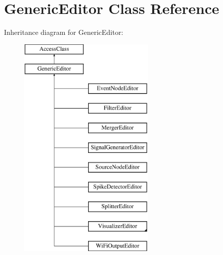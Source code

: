 \hypertarget{classGenericEditor}{\section{Generic\-Editor Class Reference}
\label{classGenericEditor}
}
Inheritance diagram for Generic\-Editor\-:\begin{figure}[H]
\begin{center}
\leavevmode
\includegraphics[height=11.000000cm]{classGenericEditor}
\end{center}
\end{figure}
